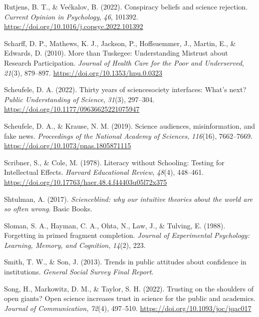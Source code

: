 \documentclass[
  jou,
  floatsintext,
  longtable,
  nolmodern,
  notxfonts,
  notimes,
  colorlinks=true,linkcolor=blue,citecolor=blue,urlcolor=blue]{apa7}
\newlength{\cslhangindent}
\newenvironment{CSLReferences}[2] %
 {\begin{list}{}{%
  \setlength{\itemindent}{0pt}
  \setlength{\leftmargin}{0pt}
  \setlength{\parsep}{0pt}
  \ifodd #1
   \setlength{\leftmargin}{\cslhangindent}
   \setlength{\itemindent}{-1\cslhangindent}
  \fi
  \setlength{\itemsep}{#2\baselineskip}}}
 {\end{list}}
\begin{document}
\begin{CSLReferences}{1}{0}
Rutjens, B. T., \& Većkalov, B. (2022). Conspiracy beliefs and science
rejection. \emph{Current Opinion in Psychology}, \emph{46}, 101392.
\url{https://doi.org/10.1016/j.copsyc.2022.101392}

Scharff, D. P., Mathews, K. J., Jackson, P., Hoffsuemmer, J., Martin,
E., \& Edwards, D. (2010). More than Tuskegee: Understanding Mistrust
about Research Participation. \emph{Journal of Health Care for the Poor
and Underserved}, \emph{21}(3), 879--897.
\url{https://doi.org/10.1353/hpu.0.0323}

Scheufele, D. A. (2022). Thirty years of science{\textendash}society
interfaces: What{'}s next? \emph{Public Understanding of Science},
\emph{31}(3), 297--304. \url{https://doi.org/10.1177/09636625221075947}

Scheufele, D. A., \& Krause, N. M. (2019). Science audiences,
misinformation, and fake news. \emph{Proceedings of the National Academy
of Sciences}, \emph{116}(16), 7662--7669.
\url{https://doi.org/10.1073/pnas.1805871115}

Scribner, S., \& Cole, M. (1978). Literacy without Schooling: Testing
for Intellectual Effects. \emph{Harvard Educational Review},
\emph{48}(4), 448--461.
\url{https://doi.org/10.17763/haer.48.4.f44403u05l72x375}

Shtulman, A. (2017). \emph{Scienceblind: why our intuitive theories
about the world are so often wrong}. Basic Books.

Sloman, S. A., Hayman, C. A., Ohta, N., Law, J., \& Tulving, E. (1988).
Forgetting in primed fragment completion. \emph{Journal of Experimental
Psychology: Learning, Memory, and Cognition}, \emph{14}(2), 223.

Smith, T. W., \& Son, J. (2013). Trends in public attitudes about
confidence in institutions. \emph{General Social Survey Final Report}.

Song, H., Markowitz, D. M., \& Taylor, S. H. (2022). Trusting on the
shoulders of open giants? Open science increases trust in science for
the public and academics. \emph{Journal of Communication}, \emph{72}(4),
497--510. \url{https://doi.org/10.1093/joc/jqac017}


\end{CSLReferences}
\end{document}
